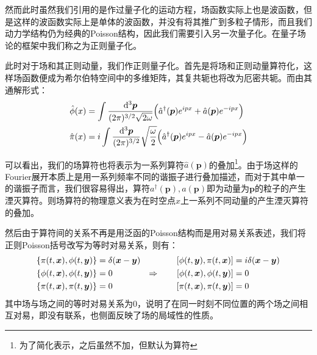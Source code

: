 然而此时虽然我们引用的是作过量子化的运动方程，场函数实际上也是波函数，但是这样的波函数实际上是单体的波函数，并没有将其推广到多粒子情形，而且我们动力学结构仍为经典的Poisson结构，因此我们需要引入另一次量子化。在量子场论的框架中我们称之为正则量子化。

此时对于场和其正则动量，我们作正则量子化。首先是将场和正则动量算符化，这样场函数便成为希尔伯特空间中的多维矩阵，其复共轭也将改为厄密共轭。而由其通解形式：
\begin{align}
\hat{\phi}(x)&=\int\frac{\mathrm{d}^3\boldsymbol{p}}{(2\pi)^{3/2}\sqrt{2\omega}}\Big(\hat{a}^{\dagger}(\boldsymbol{p})e^{ipx}+\hat{a}(\boldsymbol{p})e^{-ipx}\Big)\notag\\
\hat{\pi}(x)&=i\int\frac{\mathrm{d}^3\boldsymbol{p}}{(2\pi)^{3/2}}\sqrt{\frac{\omega}{2}}\Big(\hat{a}^{\dagger}(\boldsymbol{p})e^{ipx}-\hat{a}(\boldsymbol{p})e^{-ipx}\Big)
\end{align}

可以看出，我们的场算符也将表示为一系列算符$\hat{a}(\boldsymbol{p})$的叠加\footnote{为了简化表示，之后虽然不加$\hat{ }$，但默认为算符}。由于场这样的Fourier展开本质上是用一系列频率不同的谐振子进行叠加描述，而对于其中单一的谐振子而言，我们很容易得出，算符$a^\dagger(\boldsymbol{p}),a(\boldsymbol{p})$即为动量为$\boldsymbol{p}$的粒子的产生湮灭算符。则场算符的物理意义表为在时空点$x$上一系列不同动量的产生湮灭算符的叠加。

然后由于算符间的关系不再是用泛函的Poisson结构而是用对易关系表述，我们将正则Poisson括号改写为等时对易关系，则有：
\begin{align}
\{\pi(t,\boldsymbol{x}),\phi(t,\boldsymbol{y})\}&=\delta(\boldsymbol{x}-\boldsymbol{y})&\quad\qquad[\phi(t,\boldsymbol{y}),\pi(t,\boldsymbol{x})]&=i\delta(\boldsymbol{x}-\boldsymbol{y})\notag\\
\{\phi(t,\boldsymbol{x}),\phi(t,\boldsymbol{y})\}&=0&\Rightarrow\qquad[\phi(t,\boldsymbol{x}),\phi(t,\boldsymbol{y})]&=0\notag\\
\{\pi(t,\boldsymbol{x}),\pi(t,\boldsymbol{y})\}&=0&\quad\qquad[\pi(t,\boldsymbol{x}),\pi(t,\boldsymbol{y})]&=0
\end{align}
其中场与场之间的等时对易关系为0，说明了在同一时刻不同位置的两个场之间相互对易，即没有联系，也侧面反映了场的局域性的性质。

